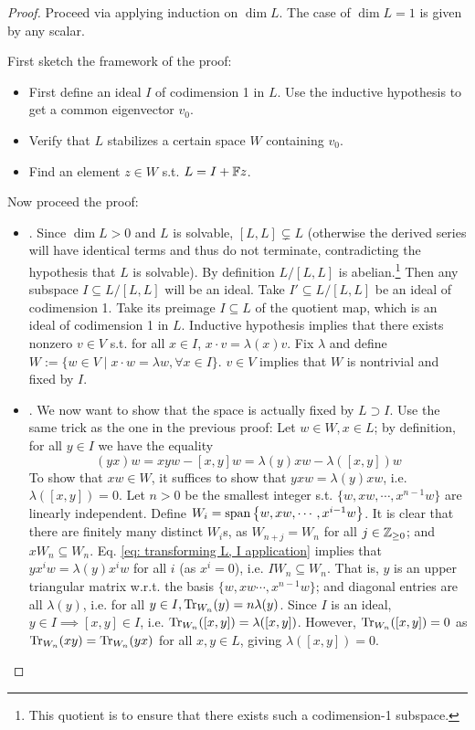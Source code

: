 \documentclass{article}
\begin{document}
\begin{proof}
    Proceed via applying induction on $\dim L$. The case of $\dim L = 1$ is given by any scalar. 
    
    First sketch the framework of the proof:
    \begin{itemize}
        \item First define an ideal $I$ of codimension 1 in $L$. Use the inductive hypothesis to get a common eigenvector $v_0$.
        \item Verify that $L$ stabilizes a certain space $W$ containing $v_0$. 
        \item Find an element $z \in W$ s.t. $L = I + \mathbb{F} z$.
    \end{itemize}
    Now proceed the proof:
    \begin{itemize}
        \item {}. Since $\dim L > 0$ and $L$ is solvable, $[L, L] \subsetneq L$ (otherwise the derived series will have identical terms and thus do not terminate, contradicting the hypothesis that $L$ is solvable). By definition $L/[L, L]$ is abelian.\footnote{This quotient is to ensure that there exists such a codimension-1 subspace.} Then any subspace $I \subseteq L/[L, L]$ will be an ideal. Take $I' \subseteq L/[L, L]$ be an ideal of codimension 1. Take its preimage $I \subseteq L$ of the quotient map, which is an ideal of codimension 1 in $L$. Inductive hypothesis implies that there exists nonzero $v \in V$ s.t. for all $x \in I$, $x \cdot v = \lambda(x)v$. Fix $\lambda$ and define $W := \{ w \in V \mid x \cdot w = \lambda w, \forall x \in I \}$. $v \in V$ implies that $W$ is nontrivial and fixed by $I$.
        \item {}. We now want to show that the space is actually fixed by $L \supset I$. Use the same trick as the one in the previous proof: Let $w \in W, x \in L$; by definition, for all $y \in I$ we have the equality
        \begin{equation}\tag{$\ast$}\label{eq: transforming L, I application}
            (yx) w = xyw - [x, y]w = \lambda(y) xw - \lambda([x, y]) w
        \end{equation}
        To show that $xw \in W$, it suffices to show that $y xw = \lambda(y) xw$, i.e. $\lambda([x, y]) = 0$. Let $n > 0$ be the smallest integer s.t. $\{ w, xw, \cdots, x^{n-1}w \}$ are linearly independent. Define $W_i = \operatorname{span}\left\{ w, xw, \cdots, x^{i-1}w \right\}$. It is clear that there are finitely many distinct $W_i$s, as $W_{n+j} = W_n$ for all $j \in \mathbb{Z}_{\geq 0}$; and $x W_n \subseteq W_n$. Eq. \eqref{eq: transforming L, I application} implies that $y x^i w = \lambda(y) x^i w$ for all $i$ (as $x^i = 0$), i.e. $I W_n \subseteq W_n$. That is, $y$ is an upper triangular matrix w.r.t. the basis $\{ w, xw \cdots, x^{n-1}w \}$; and diagonal entries are all $\lambda(y)$, i.e. for all $y \in I, \operatorname{Tr}_{W_n}(y) = n \lambda(y)$. Since $I$ is an ideal, $y \in I \implies [x, y] \in I$, i.e. $\operatorname{Tr}_{W_n}([x, y]) = \lambda([x, y])$. However, $\operatorname{Tr}_{W_n}([x, y]) = 0$ as $\operatorname{Tr}_{W_n}(xy) = \operatorname{Tr}_{W_n}(yx)$ for all $x, y \in L$, giving $\lambda([x, y]) = 0$.

\end{itemize}
\end{proof}
\end{document}
